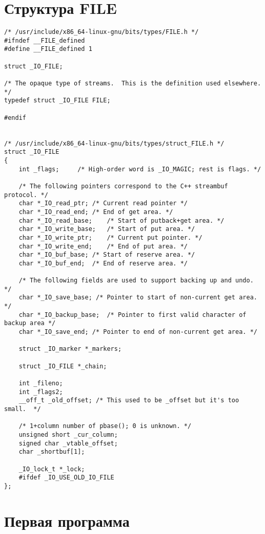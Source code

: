 \chapter{Структура FILE}

\begin{lstlisting}[caption={Структура FILE}, label=lst:FILE]
/* /usr/include/x86_64-linux-gnu/bits/types/FILE.h */
#ifndef __FILE_defined
#define __FILE_defined 1

struct _IO_FILE;

/* The opaque type of streams.  This is the definition used elsewhere.  */
typedef struct _IO_FILE FILE;

#endif


/* /usr/include/x86_64-linux-gnu/bits/types/struct_FILE.h */
struct _IO_FILE
{
	int _flags;		/* High-order word is _IO_MAGIC; rest is flags. */
	
	/* The following pointers correspond to the C++ streambuf protocol. */
	char *_IO_read_ptr;	/* Current read pointer */
	char *_IO_read_end;	/* End of get area. */
	char *_IO_read_base;	/* Start of putback+get area. */
	char *_IO_write_base;	/* Start of put area. */
	char *_IO_write_ptr;	/* Current put pointer. */
	char *_IO_write_end;	/* End of put area. */
	char *_IO_buf_base;	/* Start of reserve area. */
	char *_IO_buf_end;	/* End of reserve area. */
	
	/* The following fields are used to support backing up and undo. */
	char *_IO_save_base; /* Pointer to start of non-current get area. */
	char *_IO_backup_base;  /* Pointer to first valid character of backup area */
	char *_IO_save_end; /* Pointer to end of non-current get area. */
	
	struct _IO_marker *_markers;
	
	struct _IO_FILE *_chain;
	
	int _fileno;
	int _flags2;
	__off_t _old_offset; /* This used to be _offset but it's too small.  */
	
	/* 1+column number of pbase(); 0 is unknown. */
	unsigned short _cur_column;
	signed char _vtable_offset;
	char _shortbuf[1];
	
	_IO_lock_t *_lock;
	#ifdef _IO_USE_OLD_IO_FILE
};
\end{lstlisting}


\chapter{Первая программа}


